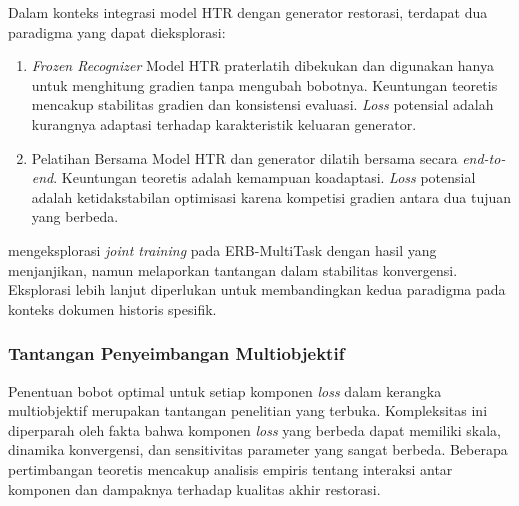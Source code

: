\begin{enumerate}[leftmargin=*, labelindent=0pt, itemsep=1ex, topsep=0pt]
Dalam konteks integrasi model HTR dengan generator restorasi, terdapat dua paradigma yang dapat dieksplorasi:

\begin{enumerate}[leftmargin=1.5em, labelsep=0.5em, itemindent=0pt, label=\alph*., topsep=0pt, parsep=0pt, itemsep=0pt]
      \item \textit{Frozen Recognizer} \mbox{} Model HTR praterlatih dibekukan dan digunakan hanya untuk menghitung gradien tanpa mengubah bobotnya. Keuntungan teoretis mencakup stabilitas gradien dan konsistensi evaluasi. \textit{Loss} potensial adalah kurangnya adaptasi terhadap karakteristik keluaran generator.

      \item Pelatihan Bersama \mbox{} Model HTR dan generator dilatih bersama secara \textit{end-to-end}. Keuntungan teoretis adalah kemampuan koadaptasi. \textit{Loss} potensial adalah ketidakstabilan optimisasi karena kompetisi gradien antara dua tujuan yang berbeda.
\end{enumerate}

\textcite{erb2021} mengeksplorasi \textit{joint training} pada ERB-MultiTask dengan hasil yang menjanjikan, namun melaporkan tantangan dalam stabilitas konvergensi. Eksplorasi lebih lanjut diperlukan untuk membandingkan kedua paradigma pada konteks dokumen historis spesifik.

\end{enumerate}

\subsubsection{Tantangan Penyeimbangan Multiobjektif}
\label{subsubsec:weight-balancing}

Penentuan bobot optimal untuk setiap komponen \textit{loss} dalam kerangka multiobjektif merupakan tantangan penelitian yang terbuka. Kompleksitas ini diperparah oleh fakta bahwa komponen \textit{loss} yang berbeda dapat memiliki skala, dinamika konvergensi, dan sensitivitas parameter yang sangat berbeda. Beberapa pertimbangan teoretis mencakup analisis empiris tentang interaksi antar komponen dan dampaknya terhadap kualitas akhir restorasi.

